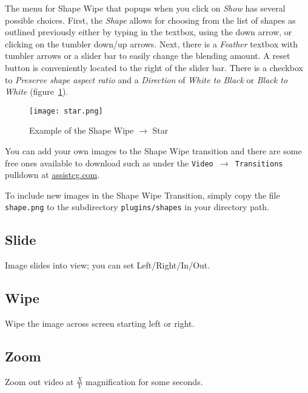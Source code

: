 The menu for Shape Wipe that popups when you click on \textit{Show} has several possible choices.  First, the \textit{Shape} allows for choosing from the list of shapes as outlined previously either by typing in the textbox, using the down arrow, or clicking on the tumbler down/up arrows.
Next, there is a \textit{Feather} textbox with tumbler arrows or a slider bar to easily change the blending amount.  A reset button is conveniently located to the right of the slider bar.  There is a checkbox to \textit{Preserve shape aspect ratio} and a \textit{Direction} of \textit{White to Black} or \textit{Black to White} (figure~\ref{fig:star}).

\begin{figure}[htpb] \centering
	\texttt{[image: star.png]}
	\caption{Example of the Shape Wipe $\rightarrow$ Star}
	\label{fig:star}
\end{figure}

You can add your own images to the Shape Wipe transition and there are some free ones available to download such as under the \texttt{Video $\rightarrow$ Transitions} pulldown at {\small \url{assistcg.com}}.

To include new images in the Shape Wipe Transition, simply copy the file \texttt{{shape}.png} to the
 subdirectory \texttt{plugins/shapes} in your \CGG{} directory path.

\subsection*{Slide}%
\label{sub:slide}

Image slides into view; you can set Left/Right/In/Out.

\subsection*{Wipe}%
\label{sub:wipe}

Wipe the image across screen starting left or right.

\subsection*{Zoom}%
\label{sub:zoom}

Zoom out video at $\frac{X}{Y}$ magnification for some seconds.

